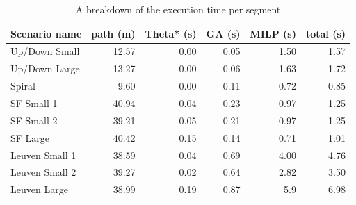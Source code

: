 \begin{table}[]
\centering
\begin{tabular}{ l | r | r | r | r | r}
Scenario name & path (m) & Theta* (s) & GA (s) & MILP (s)  & total (s) \\
\hline
Up/Down Small 	& 12.57	& 0.00 	& 0.05 	& 1.50 	& 1.57 	\\ 
Up/Down Large 	& 13.27	& 0.00 	& 0.06 	& 1.63 	& 1.72 	\\
Spiral		 	& 9.60	& 0.00 	& 0.11	& 0.72	& 0.85	\\
SF Small 1		& 40.94 & 0.04 	& 0.23 	& 0.97 	& 1.25 	\\
SF Small 2		& 39.21	& 0.05 	& 0.21	& 0.97 	& 1.25 	\\
SF Large	 	& 40.42	& 0.15	& 0.14	& 0.71 	& 1.01 	\\
Leuven Small 1 	& 38.59	& 0.04 	& 0.69	& 4.00	& 4.76	\\
Leuven Small 2	& 39.27	& 0.02 	& 0.64	& 2.82 	& 3.50	\\
Leuven Large 	& 38.99	& 0.19	& 0.87	& 5.9 	& 6.98 	\\
\end{tabular}
\caption{A breakdown of the execution time per segment}
\label{table:gen-results-rel}
\end{table}


